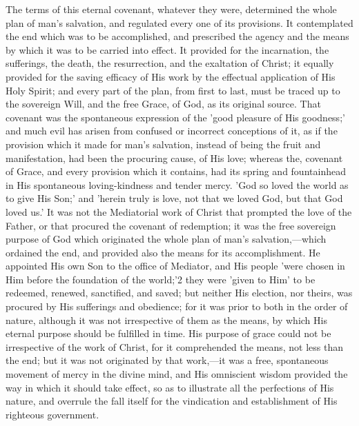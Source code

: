 \documentclass[
]{book}
\begin{document}
The terms of this eternal covenant, whatever they were, determined the whole plan of man's salvation, and regulated every one of its provisions. It contemplated the end which was to be accomplished, and prescribed the agency and the means by which it was to be carried into effect. It provided for the incarnation, the sufferings, the death, the resurrection, and the exaltation of Christ; it equally provided for the saving efficacy of His work by the effectual application of His Holy Spirit; and every part of the plan, from first to last, must be traced up to the sovereign Will, and the free Grace, of God, as its original source. That covenant was the spontaneous expression of the 'good pleasure of His goodness;' and much evil has arisen from confused or incorrect conceptions of it, as if the provision which it made for man's salvation, instead of being the fruit and manifestation, had been the procuring cause, of His love; whereas the, covenant of Grace, and every provision which it contains, had its spring and fountainhead in His spontaneous loving-kindness and tender mercy. 'God so loved the world as to give His Son;' and 'herein truly is love, not that we loved God, but that God loved us.' It was not the Mediatorial work of Christ that prompted the love of the Father, or that procured the covenant of redemption; it was the free sovereign purpose of God which originated the whole plan of man's salvation,---which ordained the end, and provided also the means for its accomplishment. He appointed His own Son to the office of Mediator, and His people 'were chosen in Him before the foundation of the world;'2 they were 'given to Him' to be redeemed, renewed, sanctified, and saved; but neither His election, nor theirs, was procured by His sufferings and obedience; for it was prior to both in the order of nature, although it was not irrespective of them as the means, by which His eternal purpose should be fulfilled in time. His purpose of grace could not be irrespective of the work of Christ, for it comprehended the means, not less than the end; but it was not originated by that work,---it was a free, spontaneous movement of mercy in the divine mind, and His omniscient wisdom provided the way in which it should take effect, so as to illustrate all the perfections of His nature, and overrule the fall itself for the vindication and establishment of His righteous government.
\end{document}
